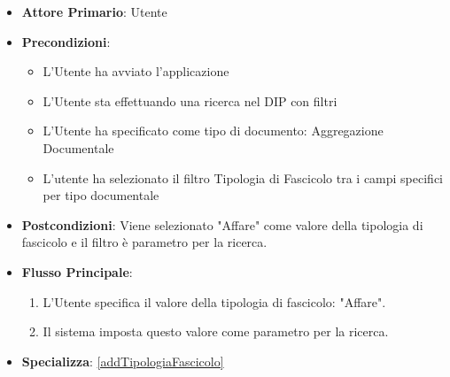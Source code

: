 \begin{itemize}
      \item \textbf{Attore Primario}: Utente
      \item \textbf{Precondizioni}: 
      \begin{itemize}
            \item L'Utente ha avviato l'applicazione
            \item L'Utente sta effettuando una ricerca nel DIP con filtri
            \item L'Utente ha specificato come tipo di documento: Aggregazione Documentale
            \item L'utente ha selezionato il filtro Tipologia di Fascicolo tra i campi specifici per tipo documentale
      \end{itemize}
      \item \textbf{Postcondizioni}: Viene selezionato "Affare" come valore della tipologia di fascicolo e il filtro è parametro per la ricerca.
      \item \textbf{Flusso Principale}:
            \begin{enumerate}
                  \item L'Utente specifica il valore della tipologia di fascicolo: "Affare".
                  \item Il sistema imposta questo valore come parametro per la ricerca.
            \end{enumerate}
      \item \textbf{Specializza}: \ref{addTipologiaFascicolo}
\end{itemize}

